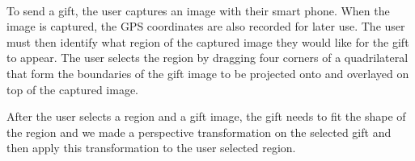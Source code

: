 \paragraph{} To send a gift, the user captures an image with their smart phone.  When the image is captured, the GPS coordinates are also recorded for later use.  The user must then identify what region of the captured image they would like for the gift to appear.  The user selects the region by dragging four corners of a quadrilateral that form the boundaries of the gift image to be projected onto and overlayed on top of the captured image.
\par After the user selects a region and a gift image, the gift needs to fit the shape of the region and we made a perspective transformation on the selected gift and then apply this transformation to the user selected region. 
